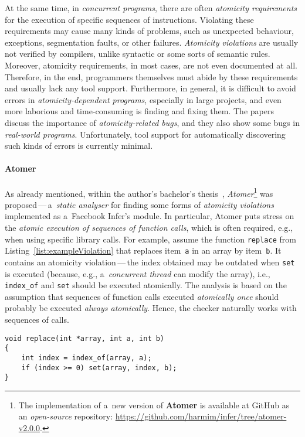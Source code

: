 At the same time, in \emph{concurrent programs}, there are often \emph{atomicity requirements} for the execution of specific sequences of instructions. Violating these requirements may cause many kinds of problems, such as unexpected behaviour, exceptions, segmentation faults, or other failures. \emph{Atomicity violations} are usually not verified by compilers, unlike syntactic or some sorts of semantic rules. Moreover, atomicity requirements, in most cases, are not even documented at all. Therefore, in the end, programmers themselves must abide by these requirements and usually lack any tool support. Furthermore, in general, it is difficult to avoid errors in \emph{atomicity-dependent programs}, especially in large projects, and even more laborious and time-consuming is finding and fixing them. The papers~\cite{contracts2017, atomizer, contracts2015, atomicityOOP} discuss the importance of \emph{atomicity-related bugs}, and they also show some bugs in \emph{real-world programs}. Unfortunately, tool support for automatically discovering such kinds of errors is currently minimal.

\paragraph{Atomer}
As already mentioned, within the author's bachelor's thesis~\cite{harmimBP}, \emph{Atomer}\footnote{The implementation of a~new version of \textbf{Atomer} is available at GitHub as an \emph{open-source} repository: \url{https://github.com/harmim/infer/tree/atomer-v2.0.0}.} was proposed\,---\,a~\emph{static analyser} for finding some forms of \emph{atomicity violations} implemented as a~Facebook Infer's module. In particular, Atomer puts stress on the \emph{atomic execution of sequences of function calls}, which is often required, e.g., when using specific library calls. For example, assume the function \texttt{replace} from Listing~\ref{list:exampleViolation} that replaces item~\texttt{a} in an array by item~\texttt{b}. It contains an atomicity violation\,---\,the index obtained may be outdated when \texttt{set} is executed (because, e.g., a~\emph{concurrent thread} can modify the array), i.e., \texttt{index\_of} and \texttt{set} should be executed atomically. The analysis is based on the assumption that sequences of function calls executed \emph{atomically once} should probably be executed \emph{always atomically}. Hence, the checker naturally works with sequences of calls.

\begin{lstlisting}[style=c, label={list:exampleViolation}, float=hbt, caption={An example of an \emph{atomicity violation}}]
void replace(int *array, int a, int b)
{
    int index = index_of(array, a);
    if (index >= 0) set(array, index, b);
}
\end{lstlisting}


